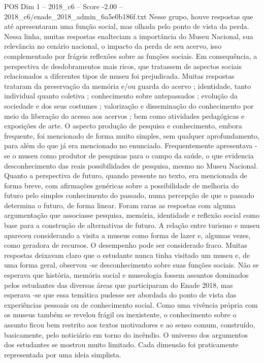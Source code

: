 \begin{textsample}{POS Dim 1 – 2018\_c6 – Score -2.00 – 2018\_c6/enade\_2018\_admin\_6a5e0b186f.txt}
Nesse grupo, houve respostas que até apresentaram uma função social, mas olhada pelo ponto de vista da perda.
Nessa linha, muitas respostas enalteciam a importância do Museu Nacional, sua relevância no cenário nacional, o impacto da perda de seu acervo, isso complementado por frágeis reflexões sobre as funções sociais.
Em consequência, a perspectiva de desdobramentos mais ricos, que tratassem de aspectos sociais relacionados a diferentes tipos de museu foi prejudicada.
Muitas respostas trataram da preservação da memória e/ou guarda do acervo ; identidade, tanto individual quanto coletiva ; conhecimento sobre antepassados ; evolução da sociedade e dos seus costumes ; valorização e disseminação do conhecimento por meio da liberação do acesso aos acervos ; bem como atividades pedagógicas e exposições de arte.
O aspecto produção de pesquisa e conhecimento, embora frequente, foi mencionado de forma muito simples, sem qualquer aprofundamento, para além do que já era mencionado no enunciado.
Frequentemente apresentava -se o museu como produtor de pesquisas para o campo da saúde, o que evidencia desconhecimento das reais possibilidades de pesquisa, mesmo no Museu Nacional.
Quanto a perspectiva de futuro, quando presente no texto, era mencionada de forma breve, com afirmações genéricas sobre a possibilidade de melhoria do futuro pelo simples conhecimento do passado, numa percepção de que o passado determina o futuro, de forma linear.
Foram raras as respostas com alguma argumentação que associasse pesquisa, memória, identidade e reflexão social como base para a construção de alternativas de futuro.
A relação entre turismo e museu apareceu considerando a visita a museus como forma de lazer e, algumas vezes, como geradora de recursos.
O desempenho pode ser considerado fraco.
Muitas respostas deixavam claro que o estudante nunca tinha visitado um museu e, de uma forma geral, observou -se desconhecimento sobre suas funções sociais.
Não se esperava que história, memória social e museologia fossem assuntos dominados pelos estudantes das diversas áreas que participaram do Enade 2018, mas esperava -se que essa temática pudesse ser abordada do ponto de vista das experiências pessoais ou de conhecimento social.
Como uma vivência própria com os museus também se revelou frágil ou inexistente, o conhecimento sobre o assunto ficou bem restrito aos textos motivadores e ao senso comum, construído, basicamente, pelo noticiário em torno do incêndio.
O universo dos argumentos dos estudantes se mostrou muito limitado.
Cada dimensão foi praticamente representada por uma ideia simplista.

\end{textsample}
